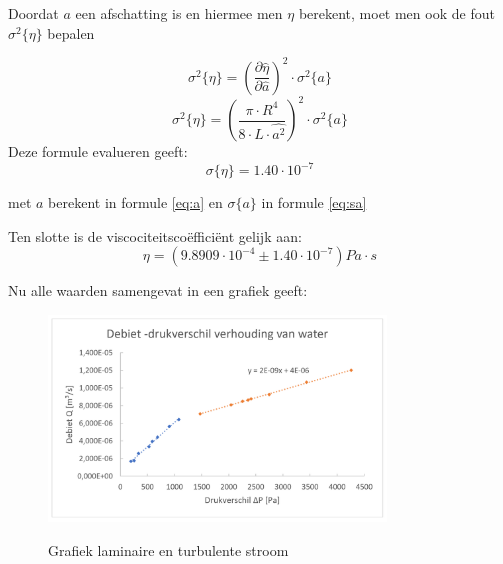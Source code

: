 Doordat $a$ een afschatting is en hiermee men $\eta$ berekent,
moet men ook de fout $\sigma ^2 \{ \eta \}$ bepalen

\begin{equation}
    \sigma ^2 \{ \eta \} = \left(\frac{\partial \hat{\eta}}{\partial \hat{a}}\right)^2 \cdot \sigma ^2 \{a\}
\end{equation}
\begin{equation*}
    \sigma ^2 \{ \eta \} = \left(\frac{\pi \cdot R^4}{8 \cdot L \cdot \hat{a^2}}\right)^2 \cdot \sigma ^2 \{a\}
\end{equation*}
Deze formule evalueren geeft:
\begin{equation*}
    \sigma \{ \eta \} = 1.40 \cdot 10^{-7}
\end{equation*}

met $a$ berekent in formule \eqref{eq:a} en $\sigma \{a\}$ in formule \eqref{eq:sa}

Ten slotte is de viscociteitsco\"effici\"ent gelijk aan:
\begin{equation*}
    \eta = (9.8909 \cdot 10^{-4} \pm 1.40 \cdot 10^{-7})Pa \cdot s
\end{equation*}

Nu alle waarden samengevat in een grafiek geeft:
\begin{figure}[H]
    \centering
    \caption{Grafiek laminaire en turbulente stroom}
    \includegraphics[width=0.8\textwidth]{img/grafiek.png}
    \label{fig:grafiek}
\end{figure}



